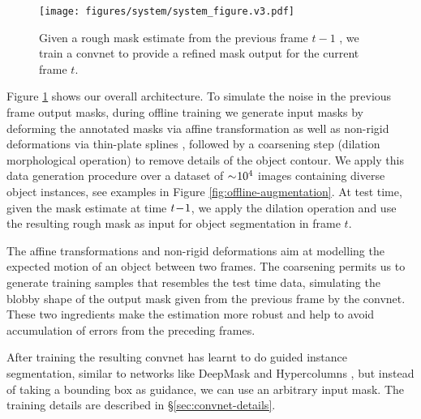 \documentclass[10pt,twocolumn,letterpaper]{article}
\begin{document}
\begin{figure}
\begin{centering}
\texttt{[image: figures/system/system\_figure.v3.pdf]}
\par\end{centering}
\caption{\label{fig:system-diagram}Given a rough mask estimate from the previous frame $t-1$
, we train a convnet to provide a refined mask output for the current frame $t$.}
\vspace{-1em}
\end{figure}


Figure \ref{fig:system-diagram} shows our overall architecture.
To simulate the noise in the previous frame output masks, during offline training we generate input masks by deforming the annotated masks via affine transformation as well as non-rigid deformations via thin-plate splines \cite{Bookstein1989Pami},
followed by a coarsening step (dilation morphological operation) to remove details of the object contour.
We apply this data generation procedure over a dataset of $\sim\negmedspace10^{4}$ images containing diverse object instances,
see examples in Figure \ref{fig:offline-augmentation}. At test time, given the mask estimate at time $t\negthinspace-\negthinspace1$, we apply the dilation operation and use the resulting rough mask as input for object
segmentation in frame $t$.


The affine transformations and non-rigid deformations aim at modelling the expected motion of an object between two frames. The coarsening permits us to generate training samples that resembles the test time data, simulating
the blobby shape of the output mask given from the previous frame by the convnet.
These two ingredients make the estimation more robust and help to avoid accumulation of errors from the preceding frames.

After training the resulting convnet has learnt to do guided instance segmentation, similar to networks like DeepMask \cite{Pinheiro2015Nips} and Hypercolumns \cite{Hariharan2015Cvpr}, but instead of taking a bounding box as guidance,
we can use an arbitrary input mask.
The training details are described in \S\ref{sec:convnet-details}.
\end{document}
